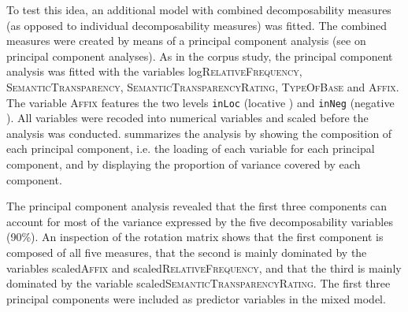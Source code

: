To test this idea, an additional model with combined decomposability measures (as opposed to individual decomposability measures) was fitted. The combined measures were created by means of a principal component analysis (see  on principal component analyses). 
As in the corpus study, the principal component analysis was fitted with the variables log\textsc{RelativeFrequency}, \textsc{SemanticTransparency}, \textsc{SemanticTransparencyRating}, \textsc{TypeOfBase} and \textsc{Affix}. The variable \textsc{Affix} features the two levels \texttt{inLoc} (locative ) and \texttt{inNeg} (negative ). All variables were recoded into numerical variables and scaled before the analysis was conducted. 
 summarizes the analysis by showing the composition of each principal component, i.e. the loading of each variable for each principal component, and by displaying the proportion of variance covered by each component. 










The principal component analysis revealed that the first three components can account for most of the variance expressed by the five decomposability variables (90\%). An inspection of the rotation matrix shows that the first component is composed of all five measures, that the second is mainly dominated by the variables scaled\textsc{Affix} and scaled\textsc{RelativeFrequency}, and that the third is mainly dominated by the variable scaled\textsc{SemanticTransparencyRating}. 
The first three principal components were included as predictor variables in the mixed model.  

\clearpage


